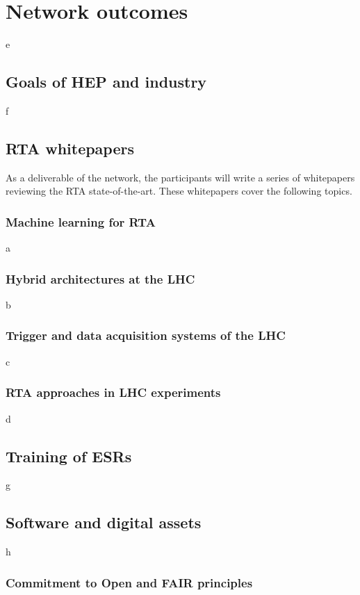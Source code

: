 \section{Network outcomes}
\label{outcomes}
e
\subsection{Goals of HEP and industry}
\label{goals}
f

\subsection{RTA whitepapers}
\label{whitepapers}
As a deliverable of the network, the participants will write a series of whitepapers reviewing the RTA state-of-the-art. These whitepapers cover the following topics.

\subsubsection{Machine learning for RTA}
\label{wp-ML-for-RTA}
a

\subsubsection{Hybrid architectures at the LHC}
\label{wp-hybrid-architectures-LHC}
b

\subsubsection{Trigger and data acquisition systems of the LHC}
\label{wp-TDAQ-at-LHC}
c

\subsubsection{RTA approaches in LHC experiments}
\label{wp-RTA-at-LHC}
d


\subsection{Training of ESRs}
\label{training}
g

\subsection{Software and digital assets}
\label{software}
h

\subsubsection{Commitment to Open and FAIR principles}
\label{open-FAIR}